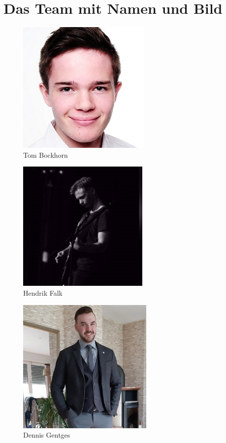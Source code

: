 \section{Das Team mit Namen und Bild}

\begin{figure}[h]
	\includegraphics{img/profil-tom-bockhorn}
	\caption{Tom Bockhorn}
	\label{fig:profil-tom-bockhorn}
\end{figure}

\begin{figure}[h]
	\includegraphics{img/profil-hendrik-falk}
	\caption{Hendrik Falk}
	\label{fig:profil-hendrik-falk}
\end{figure}

\begin{figure}[h]
	\includegraphics{img/profil-dennis-gentges}
	\caption{Dennis Gentges}
	\label{fig:profil-dennis-gentges}
\end{figure}

